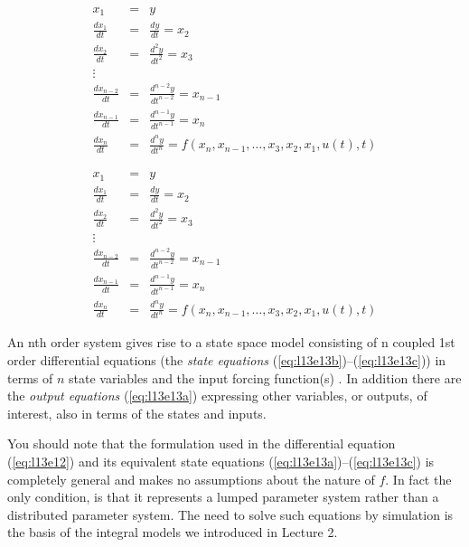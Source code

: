 \begin{eqnarray}
	x_1 & = & y \label{eq:l13e13a}\\
	\frac{dx_1}{dt} & = & \frac{dy}{dt} = x_2  \label{eq:l13e13b} \\
    \frac{dx_2}{dt} & = & \frac{d^2y}{dt^2} = x_3   \\
	 \vdots      \nonumber \\
	\frac{dx_{n-2}}{dt} & = & \frac{d^{n-2}y}{dt^{n-2}} = x_{n-1}   \\
	\frac{dx_{n-1}}{dt} & = & \frac{d^{n-1}y}{dt^{n-1}} = x_n   \\
    \frac{dx_n}{dt} &=& \frac{d^{n}y}{dt^{n}} =  f\left(x_n, x_{n-1}, \ldots, x_3, x_2, x_1, u(t), t \right) \label{eq:l13e13c}
\end{eqnarray}
\ifslidesonly
\begin{slide}
	\begin{eqnarray}
		x_1 & = & y \\
		\frac{dx_1}{dt} & = & \frac{dy}{dt} = x_2  \\
	    \frac{dx_2}{dt} & = & \frac{d^2y}{dt^2} = x_3   \\
		 \vdots      \nonumber \\
		\frac{dx_{n-2}}{dt} & = & \frac{d^{n-2}y}{dt^{n-2}} = x_{n-1}   \\
		\frac{dx_{n-1}}{dt} & = & \frac{d^{n-1}y}{dt^{n-1}} = x_n   \\
	    \frac{dx_n}{dt} &=& \frac{d^{n}y}{dt^{n}} =  f\left(x_n, x_{n-1}, \ldots, x_3, x_2, x_1, u(t), t \right)
	\end{eqnarray}
\end{slide}
\fi
An nth order system gives rise to a state space model consisting of n coupled 1st order differential equations (the \emph{state equations} (\ref{eq:l13e13b})--(\ref{eq:l13e13c})) in terms of $n$ state variables and the input forcing function(s) . In addition there are the \emph{output equations} (\ref{eq:l13e13a}) expressing other variables, or outputs, of interest, also in terms of the states and inputs.

You should note that the formulation used in the differential equation (\ref{eq:l13e12}) and its equivalent state equations (\ref{eq:l13e13a})--(\ref{eq:l13e13c}) is completely general and makes no assumptions about the nature of $f$. In fact the only condition, is that it represents a lumped parameter system rather than a distributed parameter system. The need to solve such equations by simulation is the basis of the integral models we introduced in Lecture 2.

